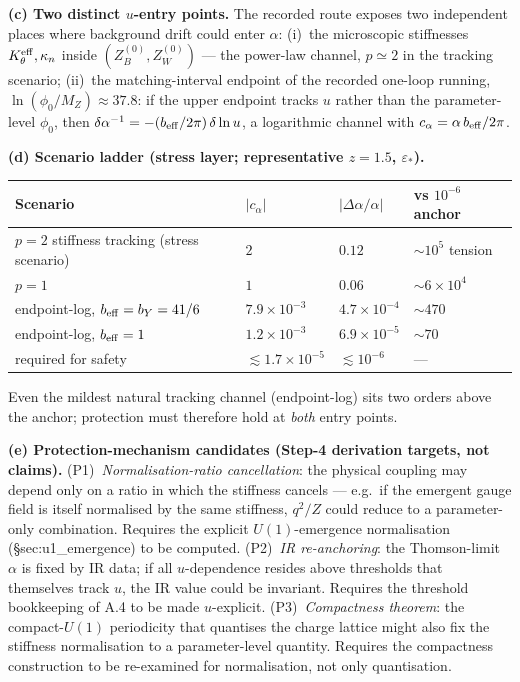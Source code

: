 \documentclass[11pt,a4paper]{article}
\begin{document}
\textbf{(c) Two distinct $u$-entry points.} The recorded route exposes two
independent places where background drift could enter $\alpha$:
(i)~the microscopic stiffnesses $K_\theta^{\rm eff},\kappa_n$ inside
$(Z_B^{(0)},Z_W^{(0)})$ --- the power-law channel, $p\simeq2$ in the tracking
scenario;
(ii)~the matching-interval endpoint of the recorded one-loop running,
$\ln(\phi_0/M_Z)\approx37.8$: if the upper endpoint tracks $u$ rather than the
parameter-level $\phi_0$, then $\delta\alpha^{-1}=-(b_{\rm eff}/2\pi)\,\delta\ln u$,
a logarithmic channel with $c_\alpha=\alpha\,b_{\rm eff}/2\pi$.

\textbf{(d) Scenario ladder (stress layer; representative $z=1.5$,
$\varepsilon_*$).}

\renewcommand{\arraystretch}{1.15}\small
\begin{longtable}{@{}p{5.4cm}p{2.6cm}p{2.4cm}p{3.0cm}@{}}
\toprule \textbf{Scenario} & $|c_\alpha|$ & $|\Delta\alpha/\alpha|$ &
\textbf{vs $10^{-6}$ anchor} \\ \midrule \endhead \bottomrule \endfoot
$p=2$ stiffness tracking (stress scenario) & $2$ & $0.12$ & $\sim10^{5}$ tension \\
$p=1$ & $1$ & $0.06$ & $\sim6\times10^{4}$ \\
endpoint-log, $b_{\rm eff}=b_Y=41/6$ & $7.9\times10^{-3}$ & $4.7\times10^{-4}$ &
$\sim470$ \\
endpoint-log, $b_{\rm eff}=1$ & $1.2\times10^{-3}$ & $6.9\times10^{-5}$ &
$\sim70$ \\
required for safety & $\lesssim1.7\times10^{-5}$ & $\lesssim10^{-6}$ & --- \\
\end{longtable}\normalsize
Even the mildest natural tracking channel (endpoint-log) sits two orders above the
anchor; protection must therefore hold at \emph{both} entry points.

\textbf{(e) Protection-mechanism candidates (Step-4 derivation targets, not
claims).}
(P1)~\emph{Normalisation-ratio cancellation}: the physical coupling may depend only
on a ratio in which the stiffness cancels --- e.g.\ if the emergent gauge field is
itself normalised by the same stiffness, $q^2/Z$ could reduce to a parameter-only
combination. Requires the explicit $U(1)$-emergence normalisation
(\S sec:u1\_emergence) to be computed.
(P2)~\emph{IR re-anchoring}: the Thomson-limit $\alpha$ is fixed by IR data; if all
$u$-dependence resides above thresholds that themselves track $u$, the IR value
could be invariant. Requires the threshold bookkeeping of A.4 to be made
$u$-explicit.
(P3)~\emph{Compactness theorem}: the compact-$U(1)$ periodicity that quantises the
charge lattice might also fix the stiffness normalisation to a parameter-level
quantity. Requires the compactness construction to be re-examined for
normalisation, not only quantisation.
\end{document}
